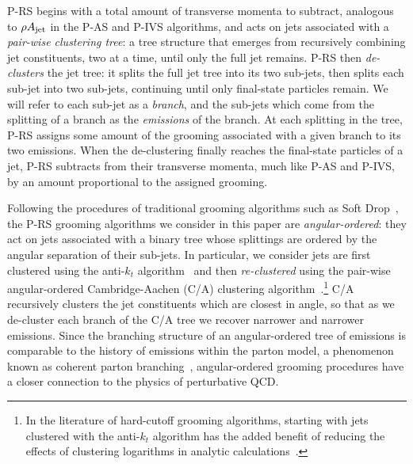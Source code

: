 P-RS begins with a total amount of transverse momenta to subtract, analogous to \(\rho A_{\rm jet}\) in the P-AS and P-IVS algorithms, and acts on jets associated with a \textit{pair-wise clustering tree}:
%
a tree structure that emerges from recursively combining jet constituents, two at a time, until only the full jet remains.
%
P-RS then \textit{de-clusters} the jet tree:
%
it splits the full jet tree into its two sub-jets, then splits each sub-jet into two sub-jets, continuing until only final-state particles remain.
%
We will refer to each sub-jet as a \textit{branch}, and the sub-jets which come from the splitting of a branch as the \textit{emissions} of the branch.
%
At each splitting in the tree, P-RS assigns some amount of the grooming associated with a given branch to its two emissions.
%
When the de-clustering finally reaches the final-state particles of a jet, P-RS subtracts from their transverse momenta, much like P-AS and P-IVS, by an amount proportional to the assigned grooming.


Following the procedures of traditional grooming algorithms such as Soft Drop~\cite{Larkoski:2014wba}, the P-RS grooming algorithms we consider in this paper are \textit{angular-ordered}:
%
they act on jets associated with a binary tree whose splittings are ordered by the angular separation of their sub-jets.
%
In particular, we consider jets are first clustered using the anti-\(k_t\) algorithm~\cite{Cacciari:2008gp} and then \textit{re-clustered} using the pair-wise angular-ordered Cambridge-Aachen (C/A) clustering algorithm~\cite{Dokshitzer:1997in}.\footnote{
In the literature of hard-cutoff grooming algorithms, starting with jets clustered with the anti-\(k_t\) algorithm has the added benefit of reducing the effects of clustering logarithms in analytic calculations~\cite{Larkoski:2014wba}.
}
%
C/A recursively clusters the jet constituents which are closest in angle, so that as we de-cluster each branch of the C/A tree we recover narrower and narrower emissions.
%
Since the branching structure of an angular-ordered tree of emissions is comparable to the history of emissions within the parton model, a phenomenon known as coherent parton branching~\cite{Collins:2011zzd}, angular-ordered grooming procedures have a closer connection to the physics of perturbative QCD.

